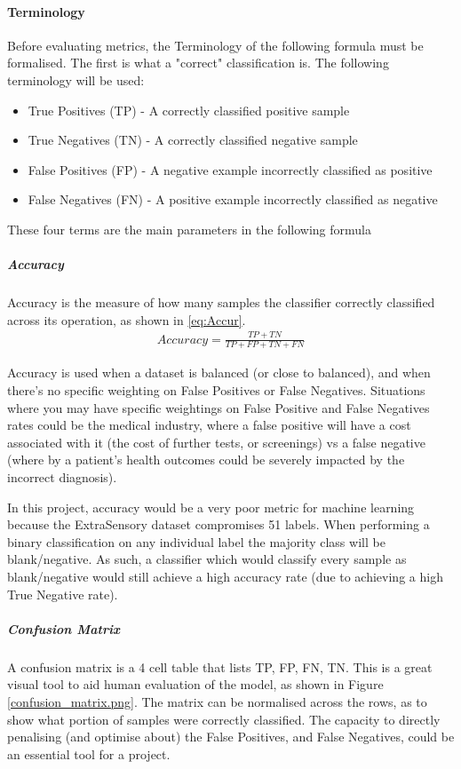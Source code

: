 \documentclass{UoNMCHA}
\newcommand{\fref}[1] {Figure \ref{#1}}
\numberwithin{equation}{section}
\begin{document}
\paragraph{Terminology} 
Before evaluating metrics, the Terminology of the following formula must be formalised. The first is what a "correct" classification is. The following terminology will be used:
\begin{itemize}
    \item True Positives (TP) - A correctly classified positive sample
    \item True Negatives (TN) - A correctly classified negative sample
    \item False Positives (FP) - A negative example incorrectly classified as positive
    \item False Negatives (FN) - A positive example incorrectly classified as negative
\end{itemize}

These four terms are the main parameters in the following formula

\subparagraph{Accuracy} 
Accuracy is the measure of how many samples the classifier correctly classified across its operation, as shown in \ref{eq:Accur}.
\begin{gather}\label{eq:Accur}
    Accuracy = \frac{TP+TN}{TP+FP+TN+FN}
\end{gather}

Accuracy is used when a dataset is balanced (or close to balanced), and when there's no specific weighting on False Positives or False Negatives. Situations where you may have specific weightings on False Positive and False Negatives rates could be the medical industry, where a false positive will have a cost associated with it (the cost of further tests, or screenings) vs a false negative (where by a patient's health outcomes could be severely impacted by the incorrect diagnosis).

In this project, accuracy would be a very poor metric for machine learning because the ExtraSensory dataset compromises 51 labels. When performing a binary classification on any individual label the majority class will be blank/negative. As such, a classifier which would classify every sample as blank/negative would still achieve a high accuracy rate (due to achieving a high True Negative rate).

\subparagraph{Confusion Matrix}
A confusion matrix is a 4 cell table that lists TP, FP, FN, TN. This is a great visual tool to aid human evaluation of the model, as shown in \fref{confusion_matrix.png}. The matrix can be normalised across the rows, as to show what portion of samples were correctly classified. The capacity to directly penalising (and optimise about) the False Positives, and False Negatives, could be an essential tool for a project. 
\end{document}
